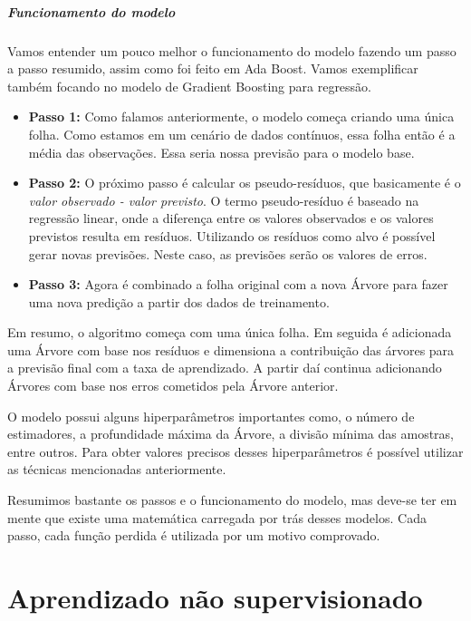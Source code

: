 \documentclass[
  letterpaper,
  DIV=11,
  numbers=noendperiod]{scrreprt}
\let\oldparagraph\paragraph
\renewcommand{\paragraph}[1]{\oldparagraph{#1}\mbox{}}
\begin{document}
\hypertarget{funcionamento-do-modelo}{%
\paragraph{Funcionamento do modelo}\label{funcionamento-do-modelo}}

Vamos entender um pouco melhor o funcionamento do modelo fazendo um
passo a passo resumido, assim como foi feito em Ada Boost. Vamos
exemplificar também focando no modelo de Gradient Boosting para
regressão.

\begin{itemize}
\item
  \textbf{Passo 1:} Como falamos anteriormente, o modelo começa criando
  uma única folha. Como estamos em um cenário de dados contínuos, essa
  folha então é a média das observações. Essa seria nossa previsão para
  o modelo base.
\item
  \textbf{Passo 2:} O próximo passo é calcular os pseudo-resíduos, que
  basicamente é o \emph{valor observado - valor previsto}. O termo
  pseudo-resíduo é baseado na regressão linear, onde a diferença entre
  os valores observados e os valores previstos resulta em resíduos.
  Utilizando os resíduos como alvo é possível gerar novas previsões.
  Neste caso, as previsões serão os valores de erros.
\item
  \textbf{Passo 3:} Agora é combinado a folha original com a nova Árvore
  para fazer uma nova predição a partir dos dados de treinamento.
\end{itemize}

Em resumo, o algoritmo começa com uma única folha. Em seguida é
adicionada uma Árvore com base nos resíduos e dimensiona a contribuição
das árvores para a previsão final com a taxa de aprendizado. A partir
daí continua adicionando Árvores com base nos erros cometidos pela
Árvore anterior.

O modelo possui alguns hiperparâmetros importantes como, o número de
estimadores, a profundidade máxima da Árvore, a divisão mínima das
amostras, entre outros. Para obter valores precisos desses
hiperparâmetros é possível utilizar as técnicas mencionadas
anteriormente.

Resumimos bastante os passos e o funcionamento do modelo, mas deve-se
ter em mente que existe uma matemática carregada por trás desses
modelos. Cada passo, cada função perdida é utilizada por um motivo
comprovado.


\hypertarget{aprendizado-nuxe3o-supervisionado}{%
\chapter{Aprendizado não
supervisionado}\label{aprendizado-nuxe3o-supervisionado}}
\end{document}
